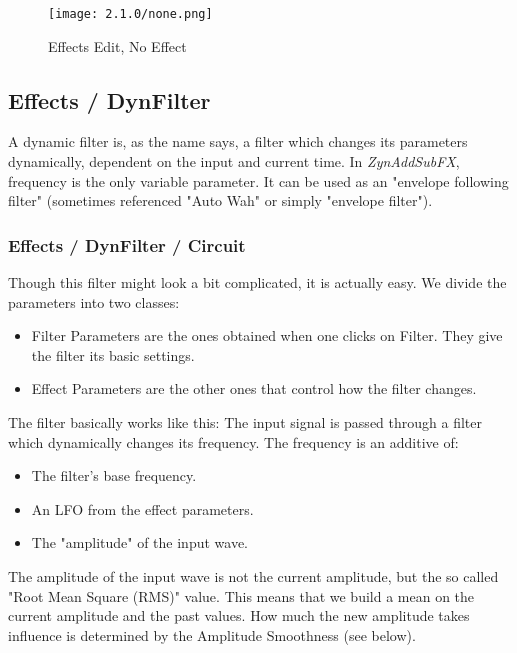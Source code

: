 \begin{figure}[H]
   \centering
   \texttt{[image: 2.1.0/none.png]}
   \caption{Effects Edit, No Effect}
   \label{fig:effects_edit_none}
\end{figure}

\subsection{Effects / DynFilter}
\label{subsec:effects_edit_dynfilter}

   A dynamic filter is, as the name says, a filter which changes its
   parameters dynamically, dependent on the input and current time. In
   \textsl{ZynAddSubFX}, frequency is the only variable parameter. It can be
   used as an "envelope following filter" (sometimes referenced "Auto Wah" or
   simply "envelope filter").

\subsubsection{Effects / DynFilter / Circuit}
\label{subsubsec:effects_edit_dynfilter_circuit}

   Though this filter might look a bit complicated, it is actually easy. We
   divide the parameters into two classes:

   \begin{itemize}
      \item Filter Parameters are the ones obtained when one clicks on Filter.
         They give the filter its basic settings.
      \item Effect Parameters are the other ones that control how the filter
         changes.
   \end{itemize}

   The filter basically works like this: The input signal is passed through a
   filter which dynamically changes its frequency. The frequency is an
   additive of:

   \begin{itemize}
      \item The filter’s base frequency.
      \item An LFO from the effect parameters.
      \item The "amplitude" of the input wave.
   \end{itemize}

   The amplitude of the input wave is not the current amplitude, but the so
   called "Root Mean Square (RMS)" value. This means that we build a mean on
   the current amplitude and the past values. How much the new amplitude
   takes influence is determined by the Amplitude Smoothness (see below).

